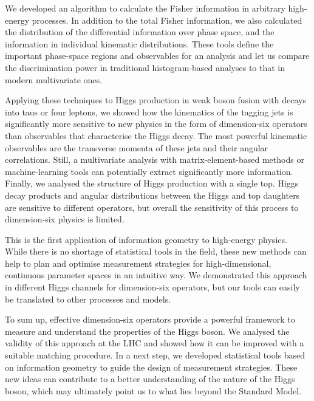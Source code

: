 We developed an algorithm to calculate the Fisher information in
arbitrary high-energy processes. In addition to the total Fisher
information, we also calculated the distribution of the differential
information over phase space, and the information in individual
kinematic distributions. These tools define the important phase-space
regions and observables for an analysis and let us compare the
discrimination power in traditional histogram-based analyses to that
in modern multivariate ones.

Applying these techniques to Higgs production in weak boson fusion
with decays into taus or four leptons, we showed how the kinematics of
the tagging jets is significantly more sensitive to new physics in the
form of dimension-six operators than observables that characterise the
Higgs decay. The most powerful kinematic observables are the
transverse momenta of these jets and their angular correlations. Still, a
multivariate analysis with matrix-element-based methods or
machine-learning tools can potentially extract significantly more
information. Finally, we analysed the structure of Higgs production
with a single top. Higgs decay products and angular distributions
between the Higgs and top daughters are sensitive to different
operators, but overall the sensitivity of this process to
dimension-six physics is limited.

This is the first application of information geometry to high-energy
physics. While there is no shortage of statistical tools in the field,
these new methods can help to plan and optimise measurement strategies
for high-dimensional, continuous parameter spaces in an intuitive
way. We demonstrated this approach in different Higgs channels for
dimension-six operators, but our tools can easily be translated to
other processes and models.

\newparagraph
%
To sum up, effective dimension-six operators provide a powerful
framework to measure and understand the properties of the Higgs
boson. We analysed the validity of this approach at the LHC and showed
how it can be improved with a suitable matching procedure. In a next
step, we developed statistical tools based on information geometry to
guide the design of measurement strategies. These new ideas can
contribute to a better understanding of the nature of the Higgs boson,
which may ultimately point us to what lies beyond the Standard Model.
